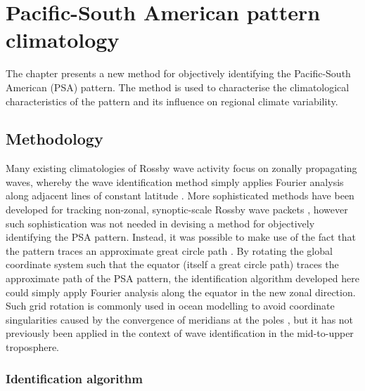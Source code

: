 
\chapter{Pacific-South American pattern climatology}\label{c:psa_climatology}


\begin{synopsis}

The chapter presents a new method for objectively identifying the Pacific-South American (PSA) pattern. The method is used to characterise the climatological characteristics of the pattern and its influence on regional climate variability.

\end{synopsis}


\section{Methodology}

Many existing climatologies of Rossby wave activity focus on zonally propagating waves, whereby the wave identification method simply applies Fourier analysis along adjacent lines of constant latitude \citep[e.g.][]{Glatt2014}. More sophisticated methods have been developed for tracking non-zonal, synoptic-scale Rossby wave packets \citep[e.g.][]{Zimin2006,Souders2014}, however such sophistication was not needed in devising a method for objectively identifying the PSA pattern. Instead, it was possible to make use of the fact that the pattern traces an approximate great circle path \citep{Hoskins1981}. By rotating the global coordinate system such that the equator (itself a great circle path) traces the approximate path of the PSA pattern, the identification algorithm developed here could simply apply Fourier analysis along the equator in the new zonal direction. Such grid rotation is commonly used in ocean modelling to avoid coordinate singularities caused by the convergence of meridians at the poles \citep[i.e. the grid is rotated to place its North Pole over a continent; e.g.][]{Bonaventura2012}, but it has not previously been applied in the context of wave identification in the mid-to-upper troposphere.

\subsection{Identification algorithm}\label{s:psa_id}

